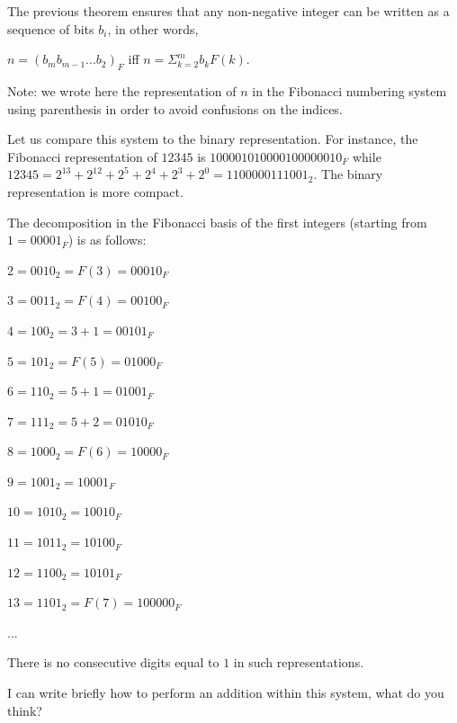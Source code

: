 The previous theorem ensures that any non-negative integer can be written
as a sequence of bits $b_i$, in other words,

$n = (b_mb_{m-1}...b_2)_F$ iff $n = \Sigma_{k=2}^m b_k F(k)$.

Note: we wrote here the representation of $n$ in the Fibonacci numbering system using parenthesis in order to avoid confusions 
on the indices.

Let us compare this system to the binary representation.
For instance, the Fibonacci representation of $12345$ is $100001010000100000010_F$
while  $12345 = 2^{13} + 2^{12} + 2^{5} + 2^{4} + 2^{3} + 2^{0} = 1100000111001_2$.
The binary representation is more compact. 
\bigskip

The decomposition in the Fibonacci basis of the first integers (starting from $1 = 00001_F$) is as follows:

 $2 = 0010_2 = F(3) = 00010_F$
 
 $3 = 0011_2 = F(4) = 00100_F$
  
 $4 = 100_2 = 3+1 = 00101_F$
 
 $5 = 101_2 = F(5) = 01000_F$
 
 $6 = 110_2 = 5+1 = 01001_F$
 
 $7 = 111_2 = 5+2 = 01010_F$
 
 $8 = 1000_2 = F(6) = 10000_F$
 
 $9 = 1001_2 = 10001_F$
 
 $10 = 1010_2 = 10010_F$
 
 $11 = 1011_2 = 10100_F$
 
 $12 = 1100_2 = 10101_F$
 
 $13 = 1101_2 = F(7) = 100000_F$
 
 ...
 
There is no consecutive digits equal to $1$ in such representations.
\medskip

{\Denis I can write briefly how to perform an addition within this system, what do you think?}

